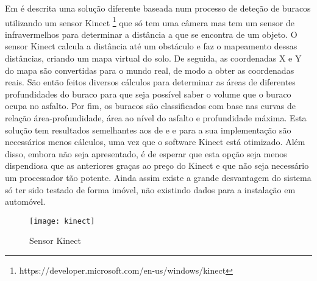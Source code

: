 Em \cite{Moazzam2013} é descrita uma solução diferente baseada num processo de deteção de buracos utilizando um sensor Kinect \footnote{https://developer.microsoft.com/en-us/windows/kinect} que só tem uma câmera mas tem um sensor de infravermelhos para determinar a distância a que se encontra de um objeto.
O sensor Kinect calcula a distância até um obstáculo e faz o mapeamento dessas distâncias, criando um mapa virtual do solo.
De seguida, as coordenadas X e Y do mapa são convertidas para o mundo real, de modo a obter as coordenadas reais.
São então feitos diversos cálculos para determinar as áreas de diferentes profundidades do buraco para que seja possível saber o volume que o buraco ocupa no asfalto.
Por fim, os buracos são classificados com base nas curvas de relação área-profundidade, área ao nível do asfalto e profundidade máxima.
Esta solução tem resultados semelhantes aos de \cite{Zhang} e \cite{Chan2014} e para a sua implementação são necessários menos cálculos, uma vez que o software Kinect está otimizado.
Além disso, embora não seja apresentado, é de esperar que esta opção seja menos dispendiosa que as anteriores graças ao preço do Kinect e que não seja necessário um processador tão potente.
Ainda assim existe a grande desvantagem do sistema só ter sido testado de forma imóvel, não existindo dados para a instalação em automóvel.

\begin{figure}[htbp]
	\centering
	\texttt{[image: kinect]}
	\caption[Sensor Kinect]{Sensor Kinect \footnotemark}
	\label{fig:sensor_kinect}
\end{figure}


